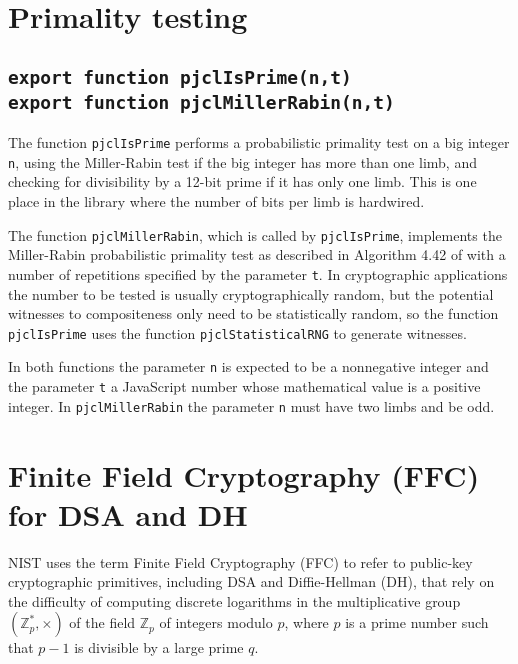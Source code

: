 \documentclass[12pt]{article}
\begin{document}
\section{Primality testing}

\subsection{\tt export function pjclIsPrime(n,t)\\export function pjclMillerRabin(n,t)}

The function {\tt pjclIsPrime} performs a probabilistic primality test
on a big integer {\tt n}, using the Miller-Rabin test if the big
integer has more than one limb, and checking for divisibility by a
12-bit prime if it has only one limb.  This is one place in the
library where the number of bits per limb is hardwired.  

The function
{\tt pjclMillerRabin}, which is called by {\tt pjclIsPrime}, implements the Miller-Rabin probabilistic
primality test as described in Algorithm 4.42 of
\cite{Menezes97handbookof} with a number of repetitions specified by the parameter {\tt t}.  
In
cryptographic applications the number to be tested is usually
cryptographically random, but the potential witnesses to compositeness only need to be
statistically random, so the function {\tt pjclIsPrime} uses the
function {\tt pjclStatisticalRNG} to generate witnesses.

In both functions the parameter {\tt n} is expected to be a nonnegative integer and the parameter {\tt t} a JavaScript number whose mathematical value is a positive integer.  In {\tt pjclMillerRabin}
the parameter {\tt n} must have two limbs and be odd.

\section{Finite Field Cryptography (FFC) for DSA and DH}
\label{s:FFC}

NIST uses the term Finite Field Cryptography (FFC) to refer to public-key cryptographic
primitives, including DSA and Diffie-Hellman (DH), that rely on the difficulty of computing discrete logarithms
in the multiplicative group $(\mathbb{Z}^*_p,\times)$ of the field $\mathbb{Z}_p$ of integers modulo $p$,
where $p$ is a prime number such that $p-1$ is divisible by a large prime $q$.  
\end{document}
